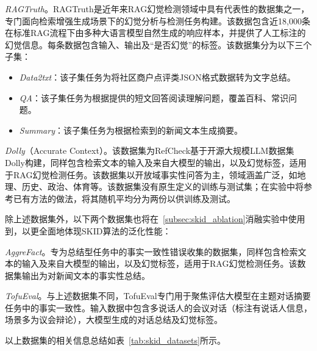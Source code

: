 
\emph{RAGTruth}\cite{niu2024ragtruth}。RAGTruth是近年来RAG幻觉检测领域中具有代表性的数据集之一，专门面向检索增强生成场景下的幻觉分析与检测任务构建。该数据包含近18,000条在标准RAG流程下由多种大语言模型自然生成的响应样本，并提供了人工标注的幻觉信息。每条数据包含输入、输出及“是否幻觉”的标签。该数据集分为以下三个子集：

\begin{itemize}
  \item \emph{Data2txt}：该子集任务为将社区商户点评类JSON格式数据转为文字总结。
  \item \emph{QA}：该子集任务为根据提供的短文回答阅读理解问题，覆盖百科、常识问题。
  \item \emph{Summary}：该子集任务为根据检索到的新闻文本生成摘要。
\end{itemize}

\emph{Dolly}（Accurate Context）\cite{hu2024refchecker,DatabricksBlog2023DollyV2}。该数据集为RefCheck\cite{hu2024refchecker}基于开源大规模LLM数据集Dolly\cite{DatabricksBlog2023DollyV2}构建，同样包含检索文本的输入及来自大模型的输出，以及幻觉标签，适用于RAG幻觉检测任务。该数据集以开放域事实性问答为主，领域涵盖广泛，如地理、历史、政治、体育等。该数据集没有原生定义的训练与测试集；在实验中将参考已有方法的做法，将其随机平均分为两份以供训练及测试。

除上述数据集外，以下两个数据集也将在~\ref{subsec:skid_ablation}消融实验中使用到，以更全面地体现SKID算法的泛化性能：

\emph{AggreFact}\cite{tang2023understanding}。专为总结型任务中的事实一致性错误收集的数据集，同样包含检索文本的输入及来自大模型的输出，以及幻觉标签，适用于RAG幻觉检测任务。该数据集输出为对新闻文本的事实性总结。

\emph{TofuEval}\cite{tang2024tofueval}。与上述数据集不同，TofuEval专门用于聚焦评估大模型在主题对话摘要任务中的事实一致性。输入数据中包含多说话人的会议对话（标注有说话人信息，场景多为议会辩论），大模型生成的对话总结及幻觉标签。

以上数据集的相关信息总结如表~\ref{tab:skid_datasets}所示。

